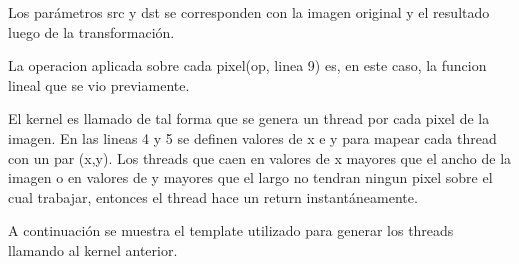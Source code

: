 \documentclass[a4paper,10pt]{report}
\begin{document}
Los parámetros src y dst se corresponden con la imagen original y el resultado luego de la transformación.

La operacion aplicada sobre cada pixel(op, linea 9) es, en este caso, la funcion lineal que se vio previamente.

El kernel es llamado de tal forma que se genera un thread por cada pixel de la imagen.
En las lineas 4 y 5 se definen valores de x e y para mapear cada thread con un par (x,y).
Los threads que caen en valores de x mayores que el ancho de la imagen o en valores de y mayores que el largo no tendran ningun pixel sobre el cual trabajar, entonces el thread hace un return instantáneamente.





% 
% 
% 












A continuación se muestra el template utilizado para generar los threads llamando al kernel anterior.
\end{document}
